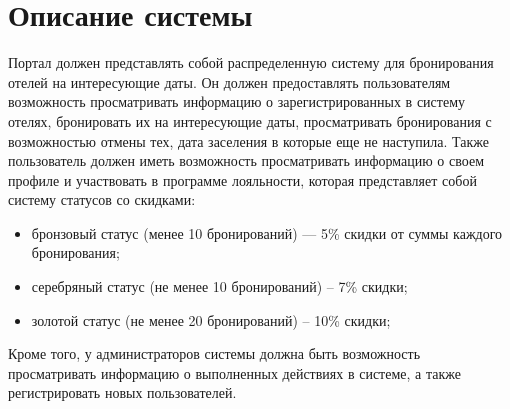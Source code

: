\section{Описание системы}
Портал должен представлять собой распределенную систему для бронирования отелей на интересующие даты. Он должен предоставлять пользователям возможность просматривать информацию о зарегистрированных в систему отелях, бронировать их на интересующие даты, просматривать бронирования с возможностью отмены тех, дата заселения в которые еще не наступила. Также пользователь должен иметь возможность просматривать информацию о своем профиле и участвовать в программе лояльности, которая представляет собой систему статусов со скидками:

\begin{itemize}
	\item бронзовый статус (менее 10 бронирований) --- 5\% скидки от суммы каждого бронирования;
	\item серебряный статус (не менее 10 бронирований) – 7\% скидки;
	\item золотой статус (не менее 20 бронирований) – 10\% скидки;
\end{itemize}

Кроме того, у администраторов системы должна быть возможность просматривать информацию о выполненных действиях в системе, а также регистрировать новых пользователей.